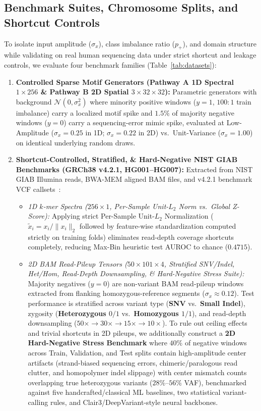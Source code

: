\documentclass[10pt,a4paper]{article}
\begin{document}
\subsection{Benchmark Suites, Chromosome Splits, and Shortcut Controls}
To isolate input amplitude ($\sigma_x$), class imbalance ratio ($p_+$), and domain structure while validating on real human sequencing data under strict shortcut and leakage controls, we evaluate four benchmark families (Table~\ref{tab:datasets}):
\begin{enumerate}
    \item \textbf{Controlled Sparse Motif Generators (Pathway A 1D Spectral $1 \times 256$ \& Pathway B 2D Spatial $3 \times 32 \times 32$):} Parametric generators with background $\mathcal{N}(0, \sigma_x^2)$ where minority positive windows ($y=1$, $100:1$ train imbalance) carry a localized motif spike and $1.5\%$ of majority negative windows ($y=0$) carry a sequencing-error mimic spike, evaluated at Low-Amplitude ($\sigma_x = 0.25$ in 1D; $\sigma_x = 0.22$ in 2D) vs.\ Unit-Variance ($\sigma_x = 1.00$) on identical underlying random draws.
    \item \textbf{Shortcut-Controlled, Stratified, \& Hard-Negative NIST GIAB Benchmarks (GRCh38 v4.2.1, HG001--HG007):} Extracted from NIST GIAB Illumina reads, BWA-MEM aligned BAM files, and v4.2.1 benchmark VCF callsets~\cite{zook2014,zook2019,krusche2019}:
    \begin{itemize}
        \item \textit{1D $k$-mer Spectra ($256 \times 1$, Per-Sample Unit-$L_2$ Norm vs.\ Global Z-Score):} Applying strict Per-Sample Unit-$L_2$ Normalization ($\tilde{x}_i = x_i / \|x_i\|_2$ followed by feature-wise standardization computed strictly on training folds) eliminates read-depth coverage shortcuts completely, reducing Max-Bin heuristic test AUROC to chance ($0.4715$).
        \item \textit{2D BAM Read-Pileup Tensors ($50 \times 101 \times 4$, Stratified SNV/Indel, Het/Hom, Read-Depth Downsampling, \& Hard-Negative Stress Suite):} Majority negatives ($y=0$) are non-variant BAM read-pileup windows extracted from flanking homozygous-reference segments ($\sigma_x \approx 0.12$). Test performance is stratified across variant type (\textbf{SNV} vs.\ \textbf{Small Indel}), zygosity (\textbf{Heterozygous $0/1$} vs.\ \textbf{Homozygous $1/1$}), and read-depth downsampling ($50\times \to 30\times \to 15\times \to 10\times$). To rule out ceiling effects and trivial shortcuts in 2D pileups, we additionally construct a \textbf{2D Hard-Negative Stress Benchmark} where $40\%$ of negative windows across Train, Validation, and Test splits contain high-amplitude center artifacts (strand-biased sequencing errors, chimeric/paralogous read clutter, and homopolymer indel slippage) with center mismatch counts overlapping true heterozygous variants ($28\%$--$56\%$ VAF), benchmarked against five handcrafted/classical ML baselines, two statistical variant-calling rules, and Clair3/DeepVariant-style neural backbones.

\end{itemize}
\end{enumerate}
\end{document}
